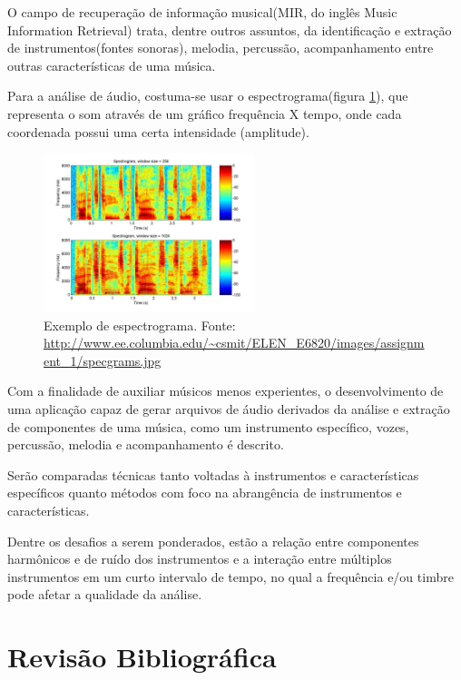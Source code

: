 \documentclass[
	12pt,				%
	openright,			%
	oneside,			%
	a4paper,			%
	english,			%
	brazil,				%
	]{abntex2}
\begin{document}
O campo de recuperação de informação musical(MIR, do inglês Music Information Retrieval) trata, dentre outros assuntos, da identificação e extração de instrumentos(fontes sonoras), melodia, percussão, acompanhamento entre outras características de uma música.

Para a análise de áudio, costuma-se usar o espectrograma(figura \ref{fig:Espectrograma_Exemplo}), que representa o som através de um gráfico frequência X tempo, onde cada coordenada possui uma certa intensidade (amplitude).

\begin{figure}[!ht]
    \centering
    \label{fig:Espectrograma_Exemplo}
    \caption{Exemplo de espectrograma. Fonte: \url{http://www.ee.columbia.edu/~csmit/ELEN_E6820/images/assignment_1/specgrams.jpg}}
    \includegraphics[width=0.55\textwidth]{Imgs/Espectrograma_Exemplo.jpg}
\end{figure}

Com a finalidade de auxiliar músicos menos experientes, o desenvolvimento de uma aplicação capaz de gerar arquivos de áudio derivados da análise e extração de componentes de uma música, como um instrumento específico, vozes, percussão, melodia e acompanhamento é descrito.

Serão comparadas técnicas tanto voltadas à instrumentos e características específicos quanto métodos com foco na abrangência de instrumentos e características.

Dentre os desafios a serem ponderados, estão a relação entre componentes harmônicos e de ruído dos instrumentos e a interação entre múltiplos instrumentos em um curto intervalo de tempo, no qual a frequência e/ou timbre pode afetar a qualidade da análise.

\chapter[Revisão Bibliográfica]{Revisão Bibliográfica}
\end{document}
